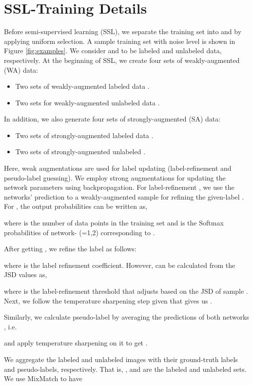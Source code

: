 \documentclass[10pt,twocolumn,letterpaper]{article}
\begin{document}
\section{SSL-Training Details} \label{sec:SSL_Training}
Before semi-supervised learning (SSL), we separate the training set into  and  by applying uniform selection. A sample training set with  noise level is shown in Figure \ref{fig:examples}. We consider  and  to be labeled and unlabeled data, respectively. At the beginning of SSL, we create four sets of weakly-augmented (WA) data:
\begin{itemize}
    \item Two sets of weakly-augmented labeled data .
    \item Two sets for weakly-augmented unlabeled data .
\end{itemize}
In addition, we also generate four sets of strongly-augmented (SA) data: 
\begin{itemize}
    \item Two sets of strongly-augmented labeled data .
    \item Two sets of strongly-augmented unlabeled .
\end{itemize}

Here, weak augmentations are used for label updating (label-refinement and pseudo-label guessing). We employ strong augmentations for updating the network parameters using backpropagation. For label-refinement \cite{li2020dividemix}, we use the networks' prediction to a weakly-augmented sample  for refining the given-label . For , the output probabilities can be written as,

where  is the number of data points in the training set and  is the Softmax probabilities of  network- (=1,2) corresponding to .

After getting , we refine the label as follows:

where  is the label refinement coefficient. However,  can be calculated from the JSD values as,

where  is the label-refinement threshold that adjusts  based on the JSD of sample . Next, we follow the temperature sharpening \cite{li2020dividemix} step given that gives us .


Similarly, we calculate pseudo-label by averaging the predictions of both networks \cite{li2020dividemix}, i.e.

and apply temperature sharpening on it to get .

We aggregate the labeled and unlabeled images with their ground-truth labels and pseudo-labels, respectively.  That is, , and  are the labeled and unlabeled sets. We use MixMatch \cite{berthelot2019mixmatch} to have
\end{document}

